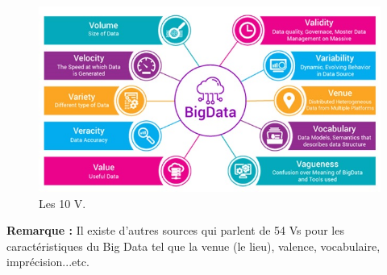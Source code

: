 \begin{figure}[h]
	\centering
	\includegraphics[scale=0.5]{img/1.6}
	\caption{Les 10 V.}
\end{figure}

\textbf{Remarque :} Il existe d'autres sources qui parlent de 54 Vs pour les caractéristiques du Big Data tel que la venue (le lieu), valence, vocabulaire, imprécision...etc.






